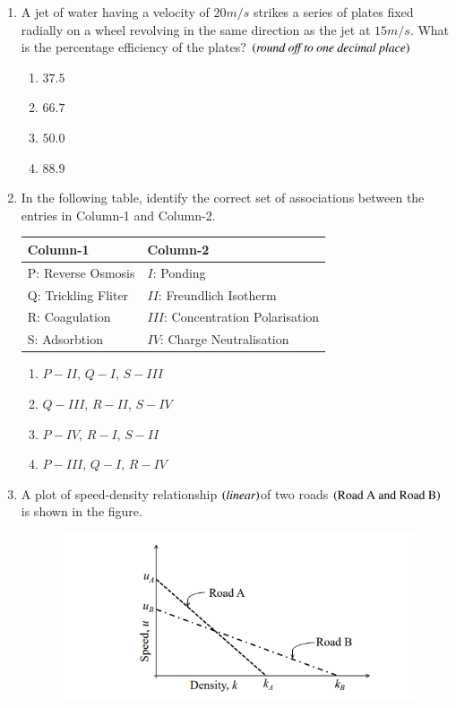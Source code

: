 \documentclass[journal,12pt,onecolumn]{IEEEtran}
\theoremstyle{remark}
\begin{document}
\begin{enumerate}
\item A jet of water having a velocity of $20m/s$ strikes a series of plates fixed radially on a wheel revolving in the same direction as the jet at $15m/s$. What is the percentage efficiency of the plates? $\left(\textit{round off to one decimal place}\right)$

\hfill{}
\begin{enumerate}
\item $37.5$
\item $66.7$
\item $50.0$
\item $88.9$
\end{enumerate}

\item In the following table, identify the correct set of associations between the entries in Column-1 and Column-2.

\hfill{}
\begin{table}[H]
\centering
\begin{tabular}{|l|l|}
\hline
Column-1 & Column-2 \\
\hline
P: Reverse Osmosis & $I$: Ponding \\
\hline
Q: Trickling Fliter & $II$: Freundlich Isotherm \\
\hline
R: Coagulation & $III$: Concentration Polarisation \\
\hline
S: Adsorbtion & $IV$: Charge Neutralisation\\
\hline
\end{tabular}
\end{table}
\begin{enumerate}
\item $P-II$, $Q-I$, $S-III$
\item $Q-III$, $R-II$, $S-IV$
\item $P-IV$, $R-I$, $S-II$
\item $P-III$, $Q-I$, $R-IV$
\end{enumerate}

\item A plot of speed-density relationship $\left(\textit{linear}\right) $of two roads $\left(\text{Road A and Road B}\right)$ is shown in the figure.
\begin{figure}[H]
\centering
\includegraphics[width=0.5\linewidth]{figs/q46.png}
\caption*{}
\label{fig:Q.46}
\end{figure}


\end{enumerate}
\end{document}
